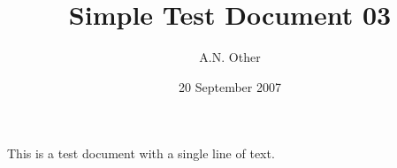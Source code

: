 \documentclass{article}
\date{20 September 2007}
\author{A.N. Other}
\title{Simple Test Document 03}
\begin{document}
\maketitle

This is a test document with a single line of text.
\end{document}

